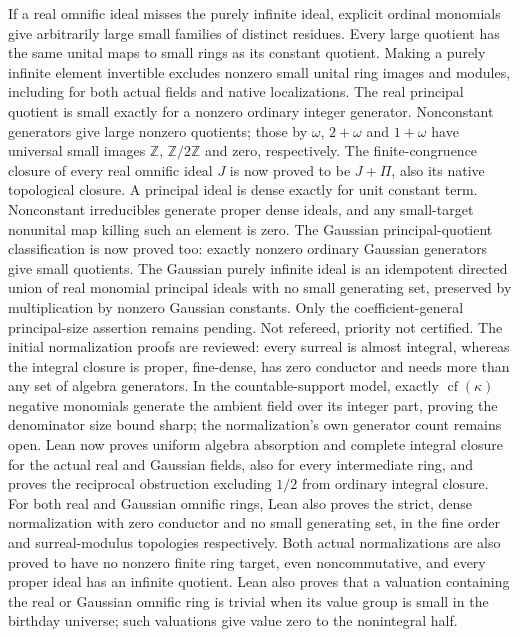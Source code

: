 \documentclass[11pt]{article}
\newcommand{\Z}{\mathbb{Z}}
\begin{document}
{If a real omnific ideal misses the purely infinite ideal, explicit ordinal
monomials give arbitrarily large small families of distinct residues.
Every large quotient
has the same unital maps to small rings as its constant quotient.
Making a purely infinite element invertible excludes nonzero small unital
ring images and modules, including for both actual fields and native
localizations. The real principal quotient is small exactly for a nonzero
ordinary integer generator. Nonconstant generators give large nonzero
quotients; those by $\omega$, $2+\omega$ and $1+\omega$ have universal
small images $\Z$, $\Z/2\Z$ and zero, respectively. The finite-congruence
closure of every real omnific ideal $J$ is now proved to be $J+\Pi$,
also its native topological closure. A principal ideal is dense exactly
for unit constant term. Nonconstant irreducibles generate proper dense
ideals, and any small-target nonunital map killing such an element is zero.
The Gaussian principal-quotient classification is now proved too: exactly
nonzero ordinary Gaussian generators give small quotients. The Gaussian
purely infinite ideal is an idempotent directed union of real monomial
principal ideals with no small generating set, preserved by multiplication
by nonzero Gaussian constants. Only the coefficient-general principal-size
assertion remains pending. Not refereed, priority not certified.
The initial normalization proofs are reviewed: every surreal is almost
integral, whereas the integral closure is proper, fine-dense, has zero
conductor and needs more than any set of algebra generators. In the
countable-support model, exactly $\operatorname{cf}(\kappa)$ negative monomials generate
the ambient field over its integer part, proving the denominator size
bound sharp; the normalization's own generator count remains open.
Lean now proves uniform algebra absorption and complete integral closure
for the actual real and Gaussian fields, also for every intermediate ring,
and proves the reciprocal obstruction excluding $1/2$ from ordinary integral closure.
For both real and Gaussian omnific rings, Lean also proves the strict,
dense normalization with zero conductor and no small generating set,
in the fine order and surreal-modulus topologies respectively.
Both actual normalizations are also proved to have no nonzero finite ring
target, even noncommutative, and every proper ideal has an infinite quotient.
Lean also proves that a valuation containing the real or Gaussian omnific
ring is trivial when its value group is small in the birthday universe;
such valuations give value zero to the nonintegral half.
}
\end{document}
